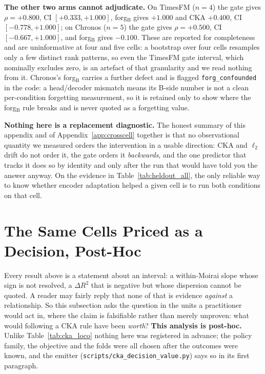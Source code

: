 \textbf{The other two arms cannot adjudicate.} On TimesFM ($n{=}4$) the gate
gives $\rho{=}{+}0.800$, CI $[+0.333, +1.000]$, forg$_\text{B}$ gives
$+1.000$ and CKA $+0.400$, CI $[-0.778, +1.000]$; on Chronos ($n{=}5$) the gate
gives $\rho{=}{+}0.500$, CI $[-0.667, +1.000]$, and forg$_\text{B}$ gives
$-0.100$. These are reported for completeness and are uninformative at four and
five cells: a bootstrap over four cells resamples only a few distinct rank
patterns, so even the TimesFM gate interval, which nominally excludes zero, is
an artefact of that granularity and we read nothing from it. Chronos's
forg$_\text{B}$ carries a further defect and is flagged
\texttt{forg\_confounded} in the code: a head/decoder mismatch means its B-side
number is not a clean per-condition forgetting measurement, so it is retained
only to show where the forg$_\text{B}$ rule breaks and is never quoted as a
forgetting value.

\textbf{Nothing here is a replacement diagnostic.} The honest summary of this
appendix and of Appendix~\ref{app:crosscell} together is that no observational
quantity we measured orders the intervention in a usable direction: CKA and
$\ell_2$ drift do not order it, the gate orders it \emph{backwards}, and the one
predictor that tracks it does so by identity and only after the run that would
have told you the answer anyway. On the evidence in Table~\ref{tab:heldout_all},
the only reliable way to know whether encoder adaptation helped a given cell is
to run both conditions on that cell.

\section{The Same Cells Priced as a Decision, Post-Hoc}
\label{app:decision}

Every result above is a statement about an interval: a within-Moirai slope whose
sign is not resolved, a $\Delta R^2$ that is negative but whose dispersion cannot be
quoted.  A reader may fairly reply that none of that is evidence \emph{against} a
relationship.  So this subsection asks the question in the units a practitioner
would act in, where the claim is falsifiable rather than merely unproven: what would
following a CKA rule have been \emph{worth}?  \textbf{This analysis is post-hoc.}
Unlike Table~\ref{tab:cka_loco} nothing here was registered in advance; the policy
family, the objective and the folds were all chosen after the outcomes were known,
and the emitter (\texttt{scripts/cka\_decision\_value.py}) says so in its first
paragraph.

